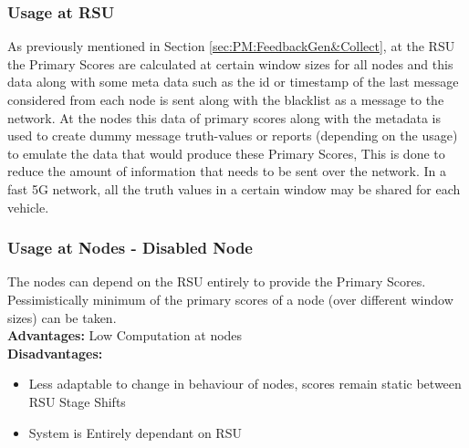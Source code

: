 \documentclass[journal]{IEEEtran}
\begin{document}
\subsubsection{Usage at RSU}
As previously mentioned in Section \ref{sec:PM:FeedbackGen&Collect}, at the RSU the Primary Scores are calculated at certain window sizes for all nodes and this data along with some meta data such as the id or timestamp of the last message considered from each node is sent along with the blacklist as a message to the network. At the nodes this data of primary scores along with the metadata is used to create dummy message truth-values or reports (depending on the usage) to emulate the data that would produce these Primary Scores, This is done to reduce the amount of information that needs to be sent over the network. In a fast 5G network, all the truth values in a certain window may be shared for each vehicle.
\subsubsection{Usage at Nodes - Disabled Node}
The nodes can depend on the RSU entirely to provide the Primary Scores. Pessimistically minimum of the primary scores of a node (over different window sizes) can be taken.\\
\textbf{Advantages:} Low Computation at nodes\\
\textbf{Disadvantages:} 
\begin{itemize}
	\item Less adaptable to change in behaviour of nodes, scores remain static between RSU Stage Shifts
	\item System is Entirely dependant on RSU
\end{itemize}
\end{document}

